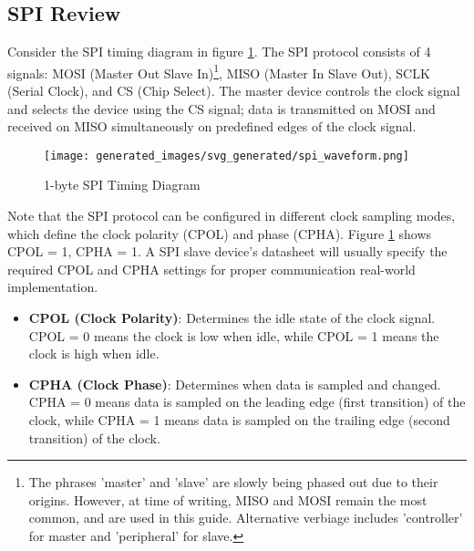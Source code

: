 \documentclass[main.tex]{subfiles}
\begin{document}


\subsection{SPI Review}
Consider the SPI timing diagram in figure \ref{fig:spi_timing}. The SPI protocol consists of 4 signals: MOSI (Master Out Slave In)\footnote{The phrases 'master' and 'slave' are slowly being phased out due to their origins. However, at time of writing, MISO and MOSI remain the most common, and are used in this guide. Alternative verbiage includes 'controller' for master and 'peripheral' for slave.}, MISO (Master In Slave Out), SCLK (Serial Clock), and CS (Chip Select). The master device controls the clock signal and selects the device using the CS signal; data is transmitted on MOSI and received on MISO simultaneously on predefined edges of the clock signal.

\begin{figure}[H]
    \centering
    \texttt{[image: generated\_images/svg\_generated/spi\_waveform.png]}
    \caption{1-byte SPI Timing Diagram}
    \label{fig:spi_timing}
\end{figure}

\noindent Note that the SPI protocol can be configured in different clock sampling modes, which define the clock polarity (CPOL) and phase (CPHA). Figure \ref{fig:spi_timing} shows CPOL = 1, CPHA = 1. A SPI slave device's datasheet will usually specify the required CPOL and CPHA settings for proper communication real-world implementation.
\begin {itemize}
    \item \textbf{CPOL (Clock Polarity)}: Determines the idle state of the clock signal. CPOL = 0 means the clock is low when idle, while CPOL = 1 means the clock is high when idle.
    \item \textbf{CPHA (Clock Phase)}: Determines when data is sampled and changed. CPHA = 0 means data is sampled on the leading edge (first transition) of the clock, while CPHA = 1 means data is sampled on the trailing edge (second transition) of the clock.
\end{itemize}
\end{document}
